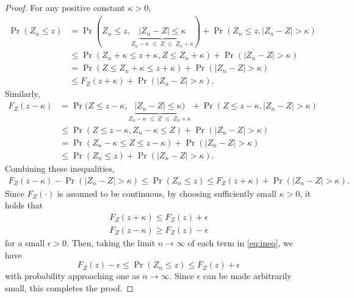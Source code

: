 \documentclass[11pt, A4paper, openany, uplatex]{book}
\begin{document}
\begin{proof}
	For any positive constant $\kappa > 0$,
	\begin{align*}
	\Pr(Z_n \le z) 
	& = \Pr(Z_n \le z, \underbrace{|Z_n - Z| \le \kappa}_{Z_n - \kappa \; \le \; Z \; \le \; Z_n + \kappa}) + \Pr(Z_n \le z, |Z_n - Z| > \kappa) \\
	& \le \Pr(Z_n + \kappa \le z + \kappa, Z \le Z_n + \kappa) + \Pr(|Z_n - Z| > \kappa) \\
	& = \Pr(Z \le Z_n + \kappa \le z + \kappa) + \Pr(|Z_n - Z| > \kappa) \\
	& \le F_Z(z + \kappa) + \Pr(|Z_n - Z| > \kappa).
	\end{align*}
	Similarly,
	\begin{align*}
	F_Z(z - \kappa)
	& = \Pr(Z \le z - \kappa, \underbrace{|Z_n - Z | \le \kappa)}_{Z_n - \kappa \; \le \; Z \; \le \; Z_n + \kappa} + \Pr(Z \le z - \kappa, |Z_n - Z| > \kappa) \\
	& \le \Pr(Z \le z - \kappa, Z_n - \kappa \le Z) + \Pr(|Z_n - Z| > \kappa) \\
	& = \Pr(Z_n - \kappa \le Z \le z - \kappa) + \Pr(|Z_n - Z| > \kappa) \\
	& \le \Pr(Z_n \le z) + \Pr(|Z_n - Z| > \kappa).
	\end{align*}
	Combining these inequalities,
	\begin{align}\label{eq:ineq}
	F_Z(z - \kappa) - \Pr(|Z_n - Z| > \kappa) \le \Pr(Z_n \le z) \le F_Z(z + \kappa) + \Pr(|Z_n - Z| > \kappa).
	\end{align}
	Since $F_Z(\cdot)$ is assumed to be continuous, by choosing sufficiently small $\kappa > 0$, it holds that 
	\begin{align*}
	F_Z(z + \kappa) \le  F_Z(z) + \epsilon \\
	F_Z(z - \kappa) \ge F_Z(z) - \epsilon
	\end{align*}
	for a small $\epsilon > 0$.
	Then, taking the limit $n \to \infty$ of each term in \eqref{eq:ineq}, we have
	\[
	F_Z(z) - \epsilon \le \Pr(Z_n \le z) \le F_Z(z) + \epsilon
	\]
	with probability approaching one as $n \to \infty$. 
	Since $\epsilon$ can be made arbitrarily small, this completes the proof.
\end{proof}
\bigskip
\end{document}
